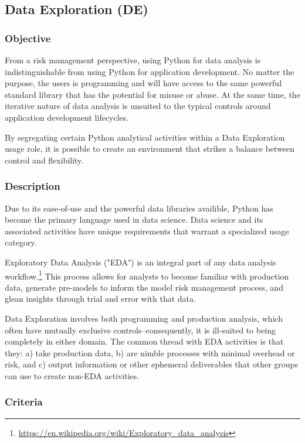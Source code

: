 	\subsection{Data Exploration (DE)}

		\subsubsection{Objective}

			From a risk management perspective, using Python for data analysis is indistinguishable from using Python for application development. No matter the purpose, the users is programming and will have access to the same powerful standard library that has the potential for misuse or abuse. At the same time, the iterative nature of data analysis is unsuited to the typical controls around application development lifecycles. 

			By segregating certain Python analytical activities within a Data Exploration usage role, it is possible to create an environment that strikes a balance between control and flexibility.

		\subsubsection{Description}

			Due to its ease-of-use and the powerful data libraries availible, Python has become the primary language used in data science. Data science and its associated activities have unique requirements that warrant a specialized usage category. 

			Exploratory Data Analysis ("EDA") is an integral part of any data analysis workflow.\footnote{\url{https://en.wikipedia.org/wiki/Exploratory_data_analysis}} This process allows for analysts to become familiar with production data, generate pre-models to inform the model risk management process, and glean insights through trial and error with that data. 

			Data Exploration involves both programming and production analysis, which often have mutually exclusive controls--consequently, it is ill-suited to being completely in either domain. The common thread with EDA activities is that they: a) take production data, b) are nimble processes with minimal overhead or risk, and c) output information or other ephemeral deliverables that other groups can use to create non-EDA activities.

		\subsubsection{Criteria}

